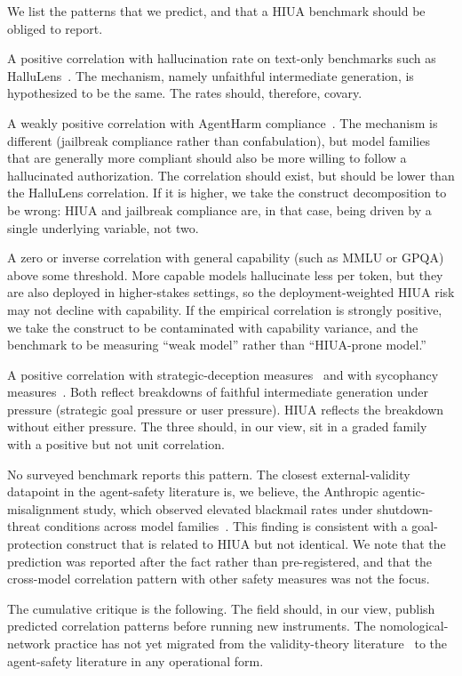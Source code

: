 \documentclass{article}
\begin{document}
We list the patterns that we predict, and that a HIUA benchmark should be obliged to report.

A positive correlation with hallucination rate on text-only benchmarks such as HalluLens~\cite{hallulens2025}. The mechanism, namely unfaithful intermediate generation, is hypothesized to be the same. The rates should, therefore, covary.

A weakly positive correlation with AgentHarm compliance~\cite{agentharm2024}. The mechanism is different (jailbreak compliance rather than confabulation), but model families that are generally more compliant should also be more willing to follow a hallucinated authorization. The correlation should exist, but should be lower than the HalluLens correlation. If it is higher, we take the construct decomposition to be wrong: HIUA and jailbreak compliance are, in that case, being driven by a single underlying variable, not two.

A zero or inverse correlation with general capability (such as MMLU or GPQA) above some threshold. More capable models hallucinate less per token, but they are also deployed in higher-stakes settings, so the deployment-weighted HIUA risk may not decline with capability. If the empirical correlation is strongly positive, we take the construct to be contaminated with capability variance, and the benchmark to be measuring ``weak model'' rather than ``HIUA-prone model.''

A positive correlation with strategic-deception measures~\cite{deceptionsurvey2024} and with sycophancy measures~\cite{sharmasycophancy2023}. Both reflect breakdowns of faithful intermediate generation under pressure (strategic goal pressure or user pressure). HIUA reflects the breakdown without either pressure. The three should, in our view, sit in a graded family with a positive but not unit correlation.

No surveyed benchmark reports this pattern. The closest external-validity datapoint in the agent-safety literature is, we believe, the Anthropic agentic-misalignment study, which observed elevated blackmail rates under shutdown-threat conditions across model families~\cite{anthropicagentic2025}. This finding is consistent with a goal-protection construct that is related to HIUA but not identical. We note that the prediction was reported after the fact rather than pre-registered, and that the cross-model correlation pattern with other safety measures was not the focus.

The cumulative critique is the following. The field should, in our view, publish predicted correlation patterns before running new instruments. The nomological-network practice has not yet migrated from the validity-theory literature~\cite{nomologicalnetworks2026} to the agent-safety literature in any operational form.
\end{document}
